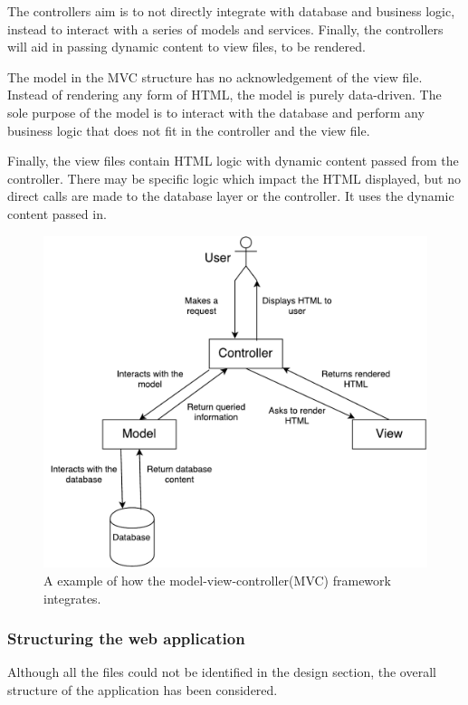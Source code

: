 The controllers aim is to not directly integrate with database and business logic, instead to interact with a series of models and services. Finally, the controllers will aid in passing dynamic content to view files, to be rendered.

The model in the MVC structure has no acknowledgement of the view file. Instead of rendering any form of HTML, the model is purely data-driven. The sole purpose of the model is to interact with the database and perform any business logic that does not fit in the controller and the view file.

Finally, the view files contain HTML logic with dynamic content passed from the controller. There may be specific logic which impact the HTML displayed, but no direct calls are made to the database layer or the controller. It uses the dynamic content passed in.

\begin{figure}[H]
  \centering
  \includegraphics[scale=0.4]{images/MVC}
  \caption{A example of how the model-view-controller(MVC) framework integrates.}
  \label{fig:mvc}
\end{figure}

\subsubsection{Structuring the web application}
Although all the files could not be identified in the design section, the overall structure of the application has been considered.

